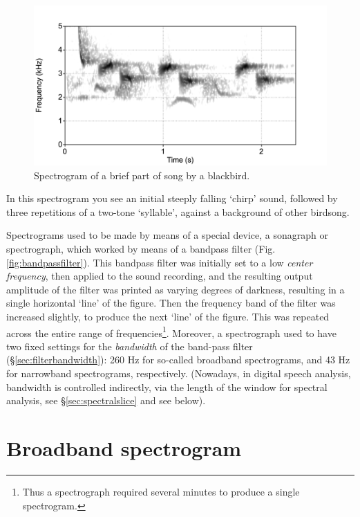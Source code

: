\documentclass[
]{book}
\begin{document}
\begin{figure}

{\centering \includegraphics{figures/merel-spectrogram} 

}

\caption{Spectrogram of a brief part of song by a blackbird.}\label{fig:merel-spectrogram}
\end{figure}

In this spectrogram you see an initial steeply falling `chirp' sound, followed by three repetitions of a two-tone `syllable', against a background of other birdsong.

Spectrograms used to be made by means of a special device, a sonagraph or spectrograph, which worked by means of a bandpass filter (Fig.\ref{fig:bandpassfilter}). This bandpass filter was initially set to a low \emph{center frequency}, then applied to the sound recording, and the resulting output amplitude of the filter was printed as varying degrees of darkness, resulting in a single horizontal `line' of the figure. Then the frequency band of the filter was increased slightly, to produce the next `line' of the figure. This was repeated across the entire range of frequencies\footnote{Thus a spectrograph required several minutes to produce a single spectrogram.}. Moreover, a spectrograph used to have two fixed settings for the \emph{bandwidth} of the band-pass filter (§\ref{sec:filterbandwidth}): 260 Hz for so-called broadband spectrograms, and 43 Hz for narrowband spectrograms, respectively. (Nowadays, in digital speech analysis, bandwidth is controlled indirectly, via the length of the window for spectral analysis, see §\ref{sec:spectralslice} and see below).

\section{Broadband spectrogram}\label{broadband-spectrogram}
\end{document}

